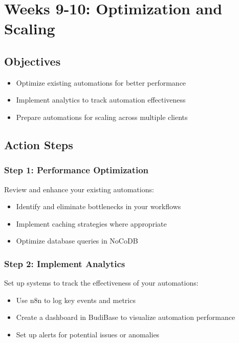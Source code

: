 
\section{Weeks 9-10: Optimization and Scaling}

\subsection{Objectives}
\begin{itemize}
    \item Optimize existing automations for better performance
    \item Implement analytics to track automation effectiveness
    \item Prepare automations for scaling across multiple clients
\end{itemize}

\subsection{Action Steps}

\subsubsection{Step 1: Performance Optimization}
Review and enhance your existing automations:

\begin{itemize}
    \item Identify and eliminate bottlenecks in your workflows
    \item Implement caching strategies where appropriate
    \item Optimize database queries in NoCoDB
\end{itemize}

\subsubsection{Step 2: Implement Analytics}
Set up systems to track the effectiveness of your automations:

\begin{itemize}
    \item Use n8n to log key events and metrics
    \item Create a dashboard in BudiBase to visualize automation performance
    \item Set up alerts for potential issues or anomalies
\end{itemize}

